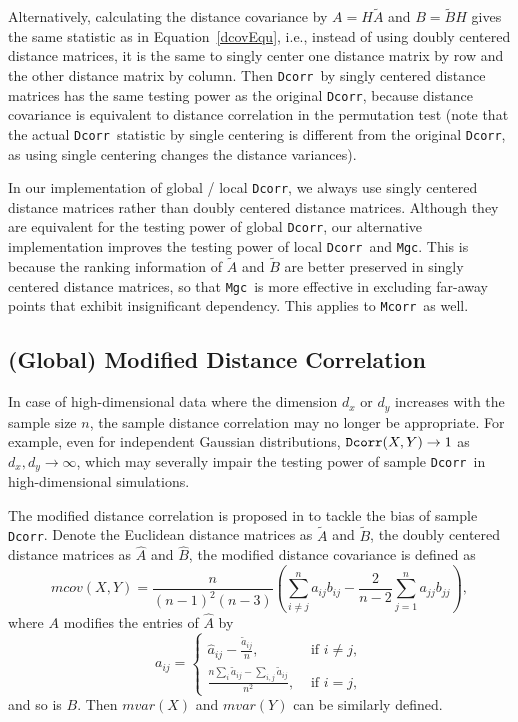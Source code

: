 \documentclass[11pt]{article}
\providecommand{\sct}[1]{{\sc \texttt{#1}}}
\newcommand{\Mgc}{\sct{Mgc}}
\newcommand{\Dcorr}{\sct{Dcorr}}
\newcommand{\Mcorr}{\sct{Mcorr}}
\begin{document}
Alternatively, calculating the distance covariance by $A=H\tilde{A}$ and $B=\tilde{B}H$ gives the same statistic as in Equation~\ref{dcovEqu}, i.e., instead of using doubly centered distance matrices, it is the same to singly center one distance matrix by row and the other distance matrix by column. Then \Dcorr~by singly centered distance matrices has the same testing power as the original \Dcorr, because distance covariance is equivalent to distance correlation in the permutation test (note that the actual \Dcorr~statistic by single centering is different from the original \Dcorr, as using single centering changes the distance variances).

In our implementation of global / local \Dcorr, we always use singly centered distance matrices rather than doubly centered distance matrices. Although they are equivalent for the testing power of global \Dcorr, our alternative implementation improves the testing power of local \Dcorr~and \Mgc. This is because the ranking information of $\tilde{A}$ and $\tilde{B}$ are better preserved in singly centered distance matrices, so that \Mgc~is more effective in excluding far-away points that exhibit insignificant dependency. This applies to \Mcorr~as well.

\subsection{(Global) Modified Distance Correlation}
\label{appen:mcorr}
In case of high-dimensional data where the dimension $d_{x}$ or $d_{y}$ increases with the sample size $n$, the sample distance correlation may no longer be appropriate. For example, even for independent Gaussian distributions, $\Dcorr(X,Y) \rightarrow 1$ as $d_{x}, d_{y} \rightarrow \infty$, which may severally impair the testing power of sample \Dcorr~in high-dimensional simulations.

The modified distance correlation is proposed in \cite{SzekelyRizzo2013a} to tackle the bias of sample \Dcorr. Denote the Euclidean distance matrices as $\tilde{A}$ and $\tilde{B}$, the doubly centered distance matrices as $\hat{A}$ and $\hat{B}$, the modified distance covariance is defined as
\begin{equation}
\label{mcovEqu}
mcov(X,Y)=\frac{n}{(n-1)^2(n-3)}(\sum_{i \neq j}^{n}a_{ij}b_{ij}-\frac{2}{n-2}\sum_{j=1}^{n}a_{jj}b_{jj}),
\end{equation}
where $A$ modifies the entries of $\hat{A}$ by
\[a_{ij} = \left\{
  \begin{array}{lr}
    \hat{a}_{ij}-\frac{\tilde{a}_{ij}}{n}, & \mbox{ if } i \neq j, \\
    \frac{n\sum_{i}\tilde{a}_{ij}-\sum_{i,j}\tilde{a}_{ij}}{n^2}, &\mbox{ if } i = j,
  \end{array}
\right.
\]
and so is $B$. Then $mvar(X)$ and $mvar(Y)$ can be similarly defined.
\end{document}
